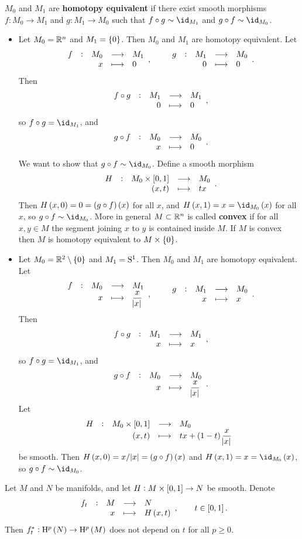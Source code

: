 \begin{definition}
$ M_0 $ and $ M_1 $ are \textbf{homotopy equivalent} if there exist smooth morphisms $ f : M_0 \to M_1 $ and $ g : M_1 \to M_0 $ such that $ f \circ g \sim \id_{M_1} $ and $ g \circ f \sim \id_{M_0} $.
\end{definition}

\begin{example}
\label{eg:2.12}
\hfill
\begin{itemize}
\item Let $ M_0 = \RR^n $ and $ M_1 = \cbr{0} $. Then $ M_0 $ and $ M_1 $ are homotopy equivalent. Let
$$ \function[f]{M_0}{M_1}{x}{0}, \qquad \function[g]{M_1}{M_0}{0}{0}. $$
Then
$$ \function[f \circ g]{M_1}{M_1}{0}{0}, $$
so $ f \circ g = \id_{M_1} $, and
$$ \function[g \circ f]{M_0}{M_0}{x}{0}. $$
We want to show that $ g \circ f \sim \id_{M_0} $. Define a smooth morphism
$$ \function[H]{M_0 \times \sbr{0, 1}}{M_0}{\br{x, t}}{tx}. $$
Then $ H\br{x, 0} = 0 = \br{g \circ f}\br{x} $ for all $ x $, and $ H\br{x, 1} = x = \id_{M_0}\br{x} $ for all $ x $, so $ g \circ f \sim \id_{M_0} $. More in general $ M \subset \RR^n $ is called \textbf{convex} if for all $ x, y \in M $ the segment joining $ x $ to $ y $ is contained inside $ M $. If $ M $ is convex then $ M $ is homotopy equivalent to $ M \times \cbr{0} $.

\pagebreak

\item Let $ M_0 = \RR^2 \setminus \cbr{0} $ and $ M_1 = \S^1 $. Then $ M_0 $ and $ M_1 $ are homotopy equivalent. Let
$$ \function[f]{M_0}{M_1}{x}{\dfrac{x}{\abs{x}}}, \qquad \function[g]{M_1}{M_0}{x}{x}. $$
Then
$$ \function[f \circ g]{M_1}{M_1}{x}{x}, $$
so $ f \circ g = \id_{M_1} $, and
$$ \function[g \circ f]{M_0}{M_0}{x}{\dfrac{x}{\abs{x}}}. $$
Let
$$ \function[H]{M_0 \times \sbr{0, 1}}{M_0}{\br{x, t}}{tx + \br{1 - t}\dfrac{x}{\abs{x}}} $$
be smooth. Then $ H\br{x, 0} = x / \abs{x} = \br{g \circ f}\br{x} $ and $ H\br{x, 1} = x = \id_{M_0}\br{x} $, so $ g \circ f \sim \id_{M_0} $.
\end{itemize}
\end{example}

\begin{proposition}
\label{prop:2.13}
Let $ M $ and $ N $ be manifolds, and let $ H : M \times \sbr{0, 1} \to N $ be smooth. Denote
$$ \function[f_t]{M}{N}{x}{H\br{x, t}}, \qquad t \in \sbr{0, 1}. $$
Then $ f_t^* : \H^p\br{N} \to \H^p\br{M} $ does not depend on $ t $ for all $ p \ge 0 $.
\end{proposition}

